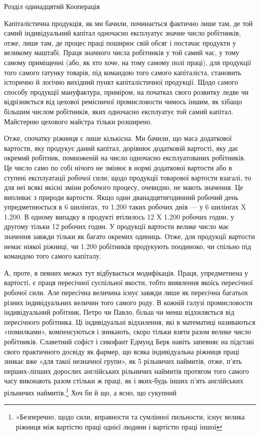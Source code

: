 Розділ одинадцятий
Кооперація

Капіталістична продукція, як ми бачили, починається фактично
лише там, де той самий індивідуальний капітал одночасно експлуатує значне число робітників, отже,
лише там, де процес праці
поширює свій обсяг і постачає продукти у великому маштабі.
Праця значного числа робітників у той самий час, у тому самому
приміщенні (або, як хто хоче, на тому самому полі праці), для продукції того самого ґатунку товарів,
під командою того самого
капіталіста, становить історично й логічно вихідний пункт капіталістичної продукції. Щодо самого
способу продукції мануфактура, приміром, на початках свого розвитку ледве чи відрізняється від
цехової ремісничої промисловости чимось іншим, як
хібащо більшим числом робітників, яких одночасно експлуатує
той самий капітал. Майстерню цехового майстра тільки розширено.

Отже, спочатку ріжниця є лише кількісна. Ми бачили, що
маса додаткової вартости, яку продукує даний капітал, дорівнює
додатковій вартості, яку дає окремий робітник, помноженій на
число одночасно експлуатованих робітників. Це число само по
собі нічого не змінює в нормі додаткової вартости або в ступені
експлуатації робочої сили; щодо продукції товарової вартости
взагалі, то для неї всякі якісні зміни робочого процесу, очевидно,
не мають значення. Це випливає з природи вартости. Якщо один
дванадцятигодинний робочий день упредметнюється в 6 шилінґах, то 1.200 таких робочих днів — у 6
шилінґах X 1.200. В одному випадку в продукті втілилось 12 X 1.200 робочих годин, у другому тільки
12 робочих годин. У продукції вартости велике число
має значення завжди тільки як багато окремих одиниць. Отже, для
продукції вартости немає ніякої ріжниці, чи 1.200 робітників продукують поодиноко, чи спільно під
командою того самого капіталу.

А, проте, в певних межах тут відбувається модифікація. Праця,
упредметнена у вартості, є праця пересічної суспільної якости,
тобто виявлення якоїсь пересічної робочої сили. Але пересічна
величина існує завжди лише як пересічна багатьох різних індивідуальних величин того самого роду. В
кожній галузі промисловости індивідуальний робітник, Петро чи Павло, більш чи менш
відхиляється від пересічного робітника. Ці індивідуальні відхилення, які в математиці називаються
«помилками», компенсуються і зникають, скоро тільки взяти разом велике число робітників. Славетний
софіст і сикофант Едмунд Берк навіть запевняє
на підставі свого практичного досвіду як фармер, що всяка індивідуальна ріжниця праці зникає вже
«для такої незначної групи»,
як 5 рільничих наймитів, отже, п’ять перших-ліпших дорослих
англійських рільничих наймитів протягом того самого часу виконають разом стільки ж праці, як і
яких-будь інших п’ять англійських рільничих наймитів.\footnote{
«Безперечно, щодо сили, вправности та сумлінної пильности, існує
велика ріжниця між вартістю праці однієї людини і вартістю праці іншої
} Хоч би й що, а ясно, що сукупний